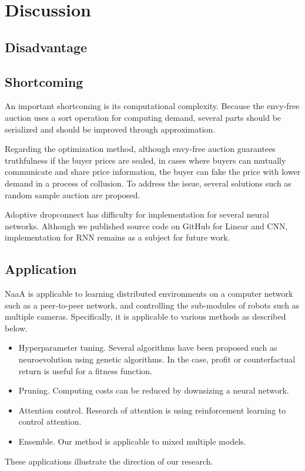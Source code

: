 \section{Discussion}
\subsection{Disadvantage}
\subsection{Shortcoming}
An important shortcoming is its computational complexity.
Because the envy-free auction uses a sort operation for computing demand,
several parts should be serialized and should be improved through approximation.

Regarding the optimization method,
although envy-free auction guarantees truthfulness if the buyer prices are sealed,
in cases where buyers can mutually communicate and share price information, 
the buyer can fake the price with lower demand in a process of collusion.
To address the issue, several solutions such as random sample auction \cite{goldberg2006competitive} are proposed.

Adoptive dropconnect has difficulty for implementation for several neural networks.
Although we published source code on GitHub for Linear and CNN, 
implementation for RNN remains as a subject for future work.

\subsection{Application}
NaaA is applicable to learning distributed environments on a computer network such as a peer-to-peer network, and controlling the sub-modules of robots such as multiple cameras.
Specifically, it is applicable to various methods as described below.
\begin{itemize}
\item Hyperparameter tuning. 
Several algorithms have been proposed such as neuroevolution using genetic algorithms.
In the case, profit or counterfactual return is useful for a fitness function.

\item Pruning. Computing costs can be reduced by downsizing a neural network.
\item Attention control. Research of attention is using reinforcement learning to control attention.
\item Ensemble. Our method is applicable to mixed multiple models.
\end{itemize}
These applications illustrate the direction of our research.